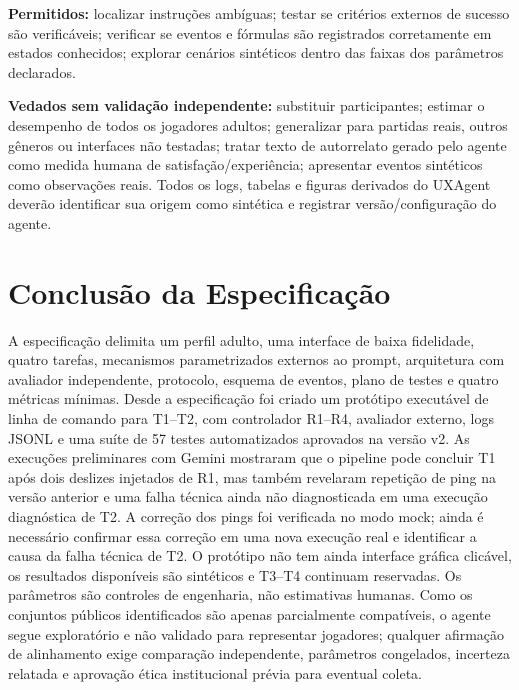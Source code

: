 \documentclass[conference]{IEEEtran}
\begin{document}
\textbf{Permitidos:} localizar instruções ambíguas; testar se critérios externos de sucesso são verificáveis; verificar se eventos e fórmulas são registrados corretamente em estados conhecidos; explorar cenários sintéticos dentro das faixas dos parâmetros declarados.

\textbf{Vedados sem validação independente:} substituir participantes; estimar o desempenho de todos os jogadores adultos; generalizar para partidas reais, outros gêneros ou interfaces não testadas; tratar texto de autorrelato gerado pelo agente como medida humana de satisfação/experiência; apresentar eventos sintéticos como observações reais. Todos os logs, tabelas e figuras derivados do UXAgent deverão identificar sua origem como sintética e registrar versão/configuração do agente.

\section{Conclusão da Especificação}

A especificação delimita um perfil adulto, uma interface de baixa fidelidade, quatro tarefas, mecanismos parametrizados externos ao prompt, arquitetura com avaliador independente, protocolo, esquema de eventos, plano de testes e quatro métricas mínimas. Desde a especificação foi criado um protótipo executável de linha de comando para T1--T2, com controlador R1--R4, avaliador externo, logs JSONL e uma suíte de 57 testes automatizados aprovados na versão v2. As execuções preliminares com Gemini mostraram que o pipeline pode concluir T1 após dois deslizes injetados de R1, mas também revelaram repetição de ping na versão anterior e uma falha técnica ainda não diagnosticada em uma execução diagnóstica de T2. A correção dos pings foi verificada no modo mock; ainda é necessário confirmar essa correção em uma nova execução real e identificar a causa da falha técnica de T2. O protótipo não tem ainda interface gráfica clicável, os resultados disponíveis são sintéticos e T3--T4 continuam reservadas. Os parâmetros são controles de engenharia, não estimativas humanas. Como os conjuntos públicos identificados são apenas parcialmente compatíveis, o agente segue exploratório e não validado para representar jogadores; qualquer afirmação de alinhamento exige comparação independente, parâmetros congelados, incerteza relatada e aprovação ética institucional prévia para eventual coleta.
\end{document}
